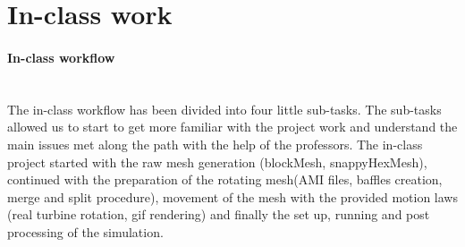 \documentclass[a4paper,12pt]{article}
\begin{document}
\section{In-class work}
\paragraph{In-class workflow}\mbox{}\\
The in-class workflow has been divided into four little sub-tasks. The sub-tasks allowed us to start to get more familiar with the project work and understand the main issues met along the path with the help of the professors. The in-class project started with the raw mesh generation (blockMesh, snappyHexMesh), continued with the preparation of the rotating mesh(AMI files, baffles creation, merge and split procedure), movement of the mesh with the provided motion laws  (real turbine rotation, gif rendering) and finally the set up, running and post processing of the simulation.
\end{document}

